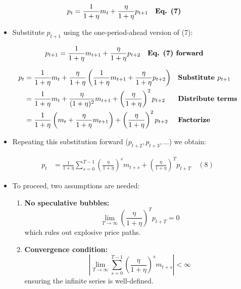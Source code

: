 \documentclass[12pt]{article}
\begin{document}
\singlespacing
\begin{align}
p_t &= \frac{1}{1+\eta} m_t + \frac{\eta}{1+\eta} p_{t+1} && \text{\textbf{Eq. (7)}} 
\end{align}

\begin{itemize}
    \item Substitute $p_{t+1}$ using the one-period-ahead version of (7):  
\end{itemize}

\singlespacing
\begin{align}
p_{t+1} &= \frac{1}{1+\eta} m_{t+1} + \frac{\eta}{1+\eta} p_{t+2} && \text{\textbf{Eq. (7) forward}} 
\end{align}

\singlespacing
\begin{align}
p_t &= \frac{1}{1+\eta} m_t + \frac{\eta}{1+\eta} \left( \frac{1}{1+\eta} m_{t+1} + \frac{\eta}{1+\eta} p_{t+2} \right) && \text{\textbf{Substitute $p_{t+1}$}} \\
    &= \frac{1}{1+\eta} m_t + \frac{\eta}{(1+\eta)^2} m_{t+1} + \left( \frac{\eta}{1+\eta} \right)^2 p_{t+2} && \text{\textbf{Distribute terms}} \\
    &= \frac{1}{1+\eta} \left( m_t + \frac{\eta}{1+\eta} m_{t+1} \right) + \left( \frac{\eta}{1+\eta} \right)^2 p_{t+2} && \text{\textbf{Factorize}} 
\end{align}

\begin{itemize}
    \item Repeating this substitution forward (\(p_{t+2}, p_{t+3}, \dots\)) we obtain:  
\end{itemize}

\singlespacing
\begin{align}
p_t &= \frac{1}{1+\eta} \sum_{s=0}^{T-1} \left( \frac{\eta}{1+\eta} \right)^s m_{t+s} 
      + \left( \frac{\eta}{1+\eta} \right)^T p_{t+T} \quad (8)
\end{align}

\begin{itemize}
    \item To proceed, two assumptions are needed:  
    \begin{enumerate}
        \item \textbf{No speculative bubbles:}  
        \[
        \lim_{T \to \infty} \left( \frac{\eta}{1+\eta} \right)^T p_{t+T} = 0
        \]  
        which rules out explosive price paths.  
        \item \textbf{Convergence condition:}  
        \[
        \left| \lim_{T \to \infty} \sum_{s=0}^{T-1} \left( \frac{\eta}{1+\eta} \right)^s m_{t+s} \right| < \infty
        \]  
        ensuring the infinite series is well-defined.  
    \end{enumerate}
\end{itemize}
\end{document}
